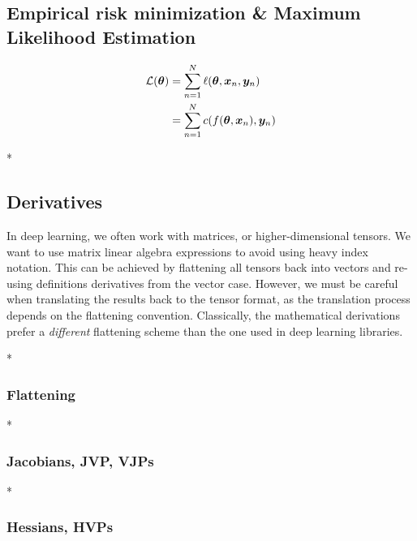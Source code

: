 \subsection{Empirical risk minimization \& Maximum Likelihood Estimation}


\begin{align}
  {\mathcal{L}}({\bm{\theta}}) &= \sum_{n=1}^N \ell({\bm{\theta}}, {\bm{x}}_n, {\bm{y}}_n)
  \\
               &=
                 \sum_{n=1}^N c(f({\bm{\theta}}, {\bm{x}}_n), {\bm{y}}_n)
\end{align}

\switchcolumn[0]

\blindtext

\switchcolumn[1]

\switchcolumn[0]* %

\blindtext

\subsection{Derivatives}

\begin{caveat}
  In deep learning, we often work with matrices, or higher-dimensional tensors.
  We want to use matrix linear algebra expressions to avoid using heavy index notation.
  This can be achieved by flattening all tensors back into vectors and re-using definitions derivatives from the vector case.
  However, we must be careful when translating the results back to the tensor format, as the translation process depends on the flattening convention.
  Classically, the mathematical derivations prefer a \emph{different} flattening scheme than the one used in deep learning libraries.
\end{caveat}

\switchcolumn[0]*
\subsubsection{Flattening}


\switchcolumn[0]*
\subsubsection{Jacobians, JVP, VJPs}


\switchcolumn[0]*
\subsubsection{Hessians, HVPs}

